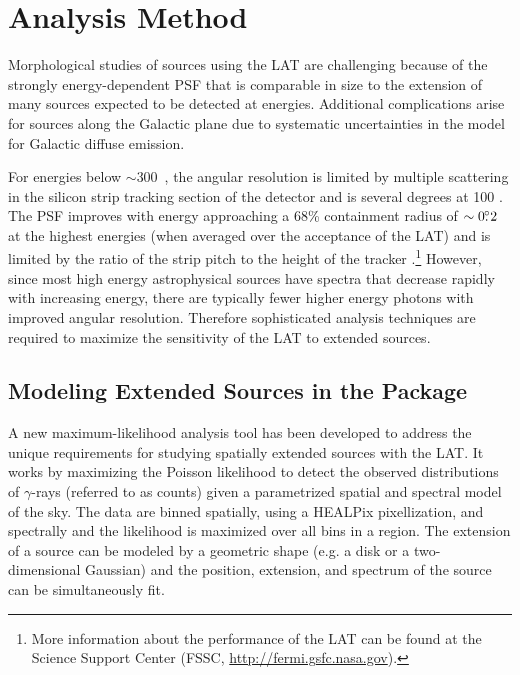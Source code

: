 \section{Analysis Method}

Morphological studies of sources using the LAT are challenging
because of the strongly energy-dependent PSF that is comparable in
size to the extension of many sources expected to be detected at
\gev energies.  Additional complications arise for sources along
the Galactic plane due to systematic uncertainties in the model for
Galactic diffuse emission.  

For energies below $\sim$300~\mev, the angular resolution is limited by
multiple scattering in the silicon strip tracking section
of the detector and is several degrees at 100 \mev.  The PSF improves
with energy approaching a 68\% containment radius of $\sim0\mbox{$.\!\!^\circ$}2$ at
the highest energies (when averaged over the acceptance of the LAT)
and is limited by the ratio of the strip pitch to the height of the tracker
\citep{atwood_2009a_large-telescope,abdo_2009a_on-orbit-calibration,ackermann_2012a_fermi-large}.\footnote{More
information about the performance of the LAT can be found at the \fermi
Science Support Center (FSSC, \url{http://fermi.gsfc.nasa.gov}).} However,
since most high energy astrophysical sources have spectra that decrease
rapidly with increasing energy, there are typically fewer higher
energy photons with improved angular resolution. Therefore sophisticated
analysis techniques are required to maximize the sensitivity of the LAT
to extended sources.

\subsection{Modeling Extended Sources in the \pointlike Package}

A new maximum-likelihood analysis tool has been developed to address the
unique requirements for studying spatially extended sources with the LAT.
It works by maximizing the Poisson 
likelihood to detect the observed distributions of $\gamma$-rays (referred to as counts)
given a parametrized spatial and spectral model of the sky.  
The data are binned spatially, using a HEALPix pixellization, and spectrally 
\citep{gorski_2005_healpix:-framework} and the likelihood is maximized over all bins in
a region.
The extension of a source can be modeled by a geometric shape
(e.g. a disk or a two-dimensional Gaussian) and the position, extension,
and spectrum of the source can be simultaneously fit.

